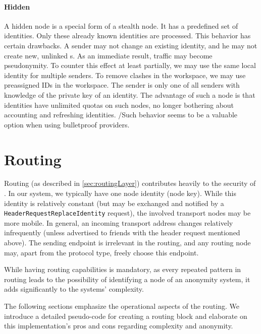 \subsubsection{Hidden \VortexNode}\label{sec:hiddenNode}
A hidden node is a special form of a stealth node. It has a predefined set of identities. Only these already known identities are processed. This behavior has certain drawbacks. A sender may not change an existing identity, and he may not create new, unlinked  s. As an immediate result, traffic may become pseudonymity. To counter this effect at least partially, we may use the same local identity for multiple senders. To remove clashes in the workspace, we may use preassigned IDs in the workspace. The sender is only one of all senders with knowledge of the private key of an identity. The advantage of such a node is that identities have unlimited quotas on such nodes, no longer bothering about accounting and refreshing identities. /Such behavior seems to be a valuable option when using bulletproof providers.

\chapter{Routing}\label{sec:routingConcerns}
Routing (as described in \cref{sec:routingLayer}) contributes heavily to the security of \MessageVortex. In our system, we typically have one node identity (node key). While this identity is relatively constant (but may be exchanged and notified by a \texttt{HeaderRequestReplaceIdentity} request), the involved transport nodes may be more mobile. In general, an incoming transport address changes relatively infrequently (unless advertised to friends with the header request mentioned above). The sending endpoint is irrelevant in the routing, and any routing node may, apart from the protocol type, freely choose this endpoint. 

While having routing capabilities is mandatory, as every repeated pattern in routing leads to the possibility of identifying a node of an anonymity system, it adds significantly to the systems' complexity.

The following sections emphasize the operational aspects of the routing. We introduce a detailed pseudo-code for creating a routing block and elaborate on this implementation's pros and cons regarding complexity and anonymity.

